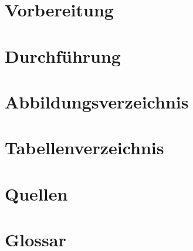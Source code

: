 \documentclass[11pt]{article}
\begin{document}
    
    \pagebreak
    \tableofcontents
    \pagebreak
    \section{Vorbereitung}
    
    \pagebreak
    \section{Durchführung}
    
    \pagebreak
    \section{Abbildungsverzeichnis}
    
    \pagebreak
    \section{Tabellenverzeichnis}
    \listoftables
    \pagebreak
    \section{Quellen}
    
    \pagebreak
    \section{Glossar}
    
\end{document}
